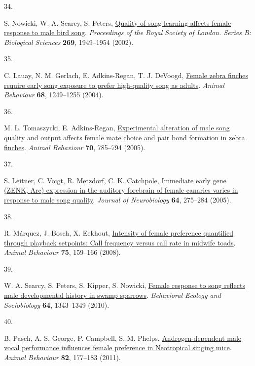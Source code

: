 \documentclass[
]{article}
\newlength{\cslhangindent}
\newlength{\csllabelwidth}
\newenvironment{CSLReferences}[2] %
 {\begin{list}{}{%
  \setlength{\itemindent}{0pt}
  \setlength{\leftmargin}{0pt}
  \setlength{\parsep}{0pt}
  \ifodd #1
   \setlength{\leftmargin}{\cslhangindent}
   \setlength{\itemindent}{-1\cslhangindent}
  \fi
  \setlength{\itemsep}{#2\baselineskip}}}
 {\end{list}}
\newcommand{\CSLLeftMargin}[1]{\parbox[t]{\csllabelwidth}{\strut#1\strut}}
\newcommand{\CSLRightInline}[1]{\parbox[t]{\linewidth - \csllabelwidth}{\strut#1\strut}}
\begin{document}
\begin{CSLReferences}{0}{0}
\CSLLeftMargin{34. }%
\CSLRightInline{S. Nowicki, W. A. Searcy, S. Peters,
\href{https://doi.org/10.1098/rspb.2002.2124}{Quality of song learning
affects female response to male bird song}. \emph{Proceedings of the
Royal Society of London. Series B: Biological Sciences} \textbf{269},
1949--1954 (2002).}

\CSLLeftMargin{35. }%
\CSLRightInline{C. Lauay, N. M. Gerlach, E. Adkins-Regan, T. J. DeVoogd,
\href{https://doi.org/10.1016/j.anbehav.2003.12.025}{Female zebra
finches require early song exposure to prefer high-quality song as
adults}. \emph{Animal Behaviour} \textbf{68}, 1249--1255 (2004).}

\CSLLeftMargin{36. }%
\CSLRightInline{M. L. Tomaszycki, E. Adkins-Regan,
\href{https://doi.org/10.1016/j.anbehav.2005.01.010}{Experimental
alteration of male song quality and output affects female mate choice
and pair bond formation in zebra finches}. \emph{Animal Behaviour}
\textbf{70}, 785--794 (2005).}

\CSLLeftMargin{37. }%
\CSLRightInline{S. Leitner, C. Voigt, R. Metzdorf, C. K. Catchpole,
\href{https://doi.org/10.1002/neu.20135}{Immediate early gene ({ZENK},
{Arc}) expression in the auditory forebrain of female canaries varies in
response to male song quality}. \emph{Journal of Neurobiology}
\textbf{64}, 275--284 (2005).}

\CSLLeftMargin{38. }%
\CSLRightInline{R. Márquez, J. Bosch, X. Eekhout,
\href{https://doi.org/10.1016/j.anbehav.2007.05.003}{Intensity of female
preference quantified through playback setpoints: Call frequency versus
call rate in midwife toads}. \emph{Animal Behaviour} \textbf{75},
159--166 (2008).}

\CSLLeftMargin{39. }%
\CSLRightInline{W. A. Searcy, S. Peters, S. Kipper, S. Nowicki,
\href{https://doi.org/10.1007/s00265-010-0949-5}{Female response to song
reflects male developmental history in swamp sparrows}. \emph{Behavioral
Ecology and Sociobiology} \textbf{64}, 1343--1349 (2010).}

\CSLLeftMargin{40. }%
\CSLRightInline{B. Pasch, A. S. George, P. Campbell, S. M. Phelps,
\href{https://doi.org/10.1016/j.anbehav.2011.04.018}{Androgen-dependent
male vocal performance influences female preference in {Neotropical}
singing mice}. \emph{Animal Behaviour} \textbf{82}, 177--183 (2011).}


\end{CSLReferences}
\end{document}

